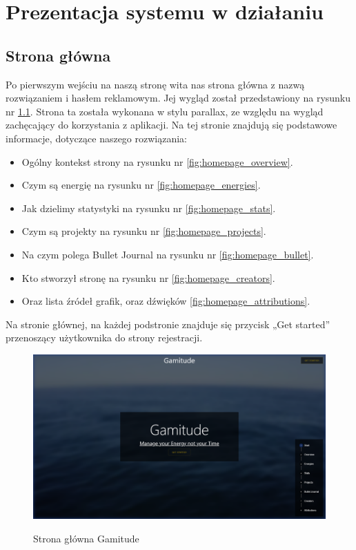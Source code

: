 \documentclass[a4paper,11pt]{report}
\begin{document}
\chapter{Prezentacja systemu w działaniu}
\section{Strona główna}
Po pierwszym wejściu na naszą stronę wita nas strona główna z nazwą rozwiązaniem i hasłem reklamowym. 
Jej wygląd został przedstawiony na rysunku nr \ref{fig:homepage}.
Strona ta została wykonana w stylu parallax, ze względu na wygląd zachęcający do korzystania z aplikacji.
Na tej stronie znajdują się podstawowe informacje, dotyczące naszego rozwiązania:
\begin{itemize}
	\item Ogólny kontekst strony na rysunku nr \ref{fig:homepage_overview}.
	\item Czym są energię na rysunku nr \ref{fig:homepage_energies}. 
	\item Jak dzielimy statystyki na rysunku nr \ref{fig:homepage_stats}.
	\item Czym są projekty na rysunku nr \ref{fig:homepage_projects}.
	\item Na czym polega Bullet Journal na rysunku nr \ref{fig:homepage_bullet}.
	\item Kto stworzył stronę na rysunku nr \ref{fig:homepage_creators}.
	\item Oraz lista źródeł grafik, oraz dźwięków \ref{fig:homepage_attributions}.
\end{itemize}
Na stronie głównej, na każdej podstronie znajduje się przycisk „Get started” przenoszący użytkownika do strony rejestracji.
\begin{figure}[H]
	\centering
	\includegraphics[scale=0.3]{prezentacja/Homepage}\\
	\caption{Strona główna Gamitude}
	\label{fig:homepage}
\end{figure}
\end{document}
